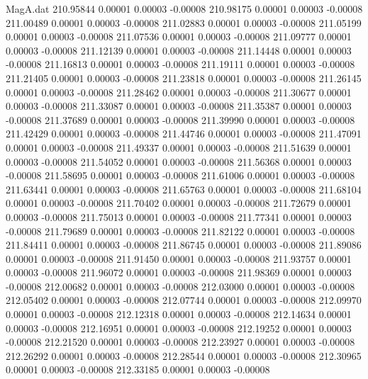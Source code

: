 \begin{filecontents}{MagA.dat}
 210.95844    0.00001    0.00003   -0.00008
 210.98175    0.00001    0.00003   -0.00008
 211.00489    0.00001    0.00003   -0.00008
 211.02883    0.00001    0.00003   -0.00008
 211.05199    0.00001    0.00003   -0.00008
 211.07536    0.00001    0.00003   -0.00008
 211.09777    0.00001    0.00003   -0.00008
 211.12139    0.00001    0.00003   -0.00008
 211.14448    0.00001    0.00003   -0.00008
 211.16813    0.00001    0.00003   -0.00008
 211.19111    0.00001    0.00003   -0.00008
 211.21405    0.00001    0.00003   -0.00008
 211.23818    0.00001    0.00003   -0.00008
 211.26145    0.00001    0.00003   -0.00008
 211.28462    0.00001    0.00003   -0.00008
 211.30677    0.00001    0.00003   -0.00008
 211.33087    0.00001    0.00003   -0.00008
 211.35387    0.00001    0.00003   -0.00008
 211.37689    0.00001    0.00003   -0.00008
 211.39990    0.00001    0.00003   -0.00008
 211.42429    0.00001    0.00003   -0.00008
 211.44746    0.00001    0.00003   -0.00008
 211.47091    0.00001    0.00003   -0.00008
 211.49337    0.00001    0.00003   -0.00008
 211.51639    0.00001    0.00003   -0.00008
 211.54052    0.00001    0.00003   -0.00008
 211.56368    0.00001    0.00003   -0.00008
 211.58695    0.00001    0.00003   -0.00008
 211.61006    0.00001    0.00003   -0.00008
 211.63441    0.00001    0.00003   -0.00008
 211.65763    0.00001    0.00003   -0.00008
 211.68104    0.00001    0.00003   -0.00008
 211.70402    0.00001    0.00003   -0.00008
 211.72679    0.00001    0.00003   -0.00008
 211.75013    0.00001    0.00003   -0.00008
 211.77341    0.00001    0.00003   -0.00008
 211.79689    0.00001    0.00003   -0.00008
 211.82122    0.00001    0.00003   -0.00008
 211.84411    0.00001    0.00003   -0.00008
 211.86745    0.00001    0.00003   -0.00008
 211.89086    0.00001    0.00003   -0.00008
 211.91450    0.00001    0.00003   -0.00008
 211.93757    0.00001    0.00003   -0.00008
 211.96072    0.00001    0.00003   -0.00008
 211.98369    0.00001    0.00003   -0.00008
 212.00682    0.00001    0.00003   -0.00008
 212.03000    0.00001    0.00003   -0.00008
 212.05402    0.00001    0.00003   -0.00008
 212.07744    0.00001    0.00003   -0.00008
 212.09970    0.00001    0.00003   -0.00008
 212.12318    0.00001    0.00003   -0.00008
 212.14634    0.00001    0.00003   -0.00008
 212.16951    0.00001    0.00003   -0.00008
 212.19252    0.00001    0.00003   -0.00008
 212.21520    0.00001    0.00003   -0.00008
 212.23927    0.00001    0.00003   -0.00008
 212.26292    0.00001    0.00003   -0.00008
 212.28544    0.00001    0.00003   -0.00008
 212.30965    0.00001    0.00003   -0.00008
 212.33185    0.00001    0.00003   -0.00008

\end{filecontents}
